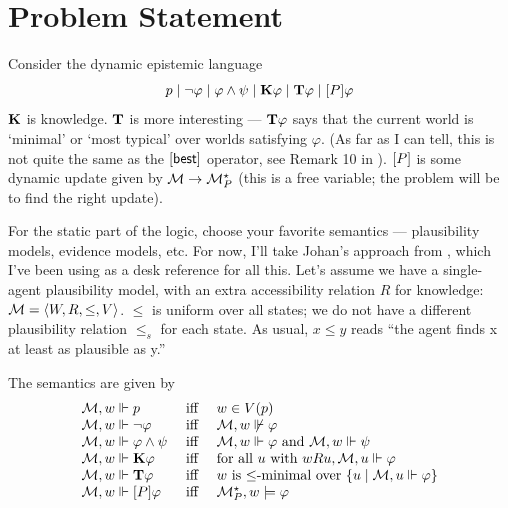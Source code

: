 \documentclass[letterpaper]{article}
\begin{document}
\section*{Problem Statement}

Consider the dynamic epistemic language
\[
    p \mid \neg \varphi \mid \varphi \land \psi \mid \textrm{\textup{\textbf{K}}} \varphi \mid \textrm{\textup{\textbf{T}}} \varphi \mid [P] \varphi
\]
$\textrm{\textup{\textbf{K}}}$ is knowledge.  $\textrm{\textup{\textbf{T}}}$ is more interesting --- $\textrm{\textup{\textbf{T}}} \varphi$ says that the current world is `minimal' or `most typical' over worlds satisfying $\varphi$.  (As far as I can tell, this is not quite the same as the $[\mathsf{best}]$ operator, see Remark 10 in \cite{van2007beliefrevision}).  $[P]$ is some dynamic update given by $\mathcal{M} \to \mathcal{M}^\star_P$ (this is a free variable; the problem will be to find the right update).

For the static part of the logic, choose your favorite semantics --- plausibility models, evidence models, etc.  For now, I'll take Johan's approach from \cite{van2011logical}, which I've been using as a desk reference for all this.  Let's assume we have a single-agent plausibility model, with an extra accessibility relation $R$ for knowledge: $\mathcal{M} = \langle W, R, \leq, V \rangle$.  $\leq$ is uniform over all states; we do not have a different plausibility relation $\leq_s$ for each state.  As usual, $x \leq y$ reads ``the agent finds x at least as plausible as y.''

\begin{definition}
    The semantics are given by
    \[
    \begin{array}{lcl}
        \mathcal{M}, w \Vdash p & \mbox{ iff } & w \in V(p)\\
        \mathcal{M}, w \Vdash \neg \varphi & \mbox{ iff } & \mathcal{M}, w \not \Vdash \varphi\\
        \mathcal{M}, w \Vdash \varphi \land \psi & \mbox{ iff } & \mathcal{M}, w \Vdash \varphi \mbox{ and } \mathcal{M}, w \Vdash \psi\\
        \mathcal{M}, w \Vdash \textrm{\textup{\textbf{K}}} \varphi & \mbox{ iff } & \mbox{for all } u \mbox{ with } w{R}u, \mathcal{M}, u \Vdash \varphi \\
        \mathcal{M}, w \Vdash \textrm{\textup{\textbf{T}}} \varphi & \mbox{ iff } & w \mbox{ is } {\leq}\mbox{-minimal over } \{ u \mid \mathcal{M}, u \Vdash \varphi \} \\
        \mathcal{M}, w \Vdash [P] \varphi & \mbox{ iff } & \mathcal{M}^\star_P, w \models \varphi
    \end{array}
    \]
\end{definition}
\end{document}
